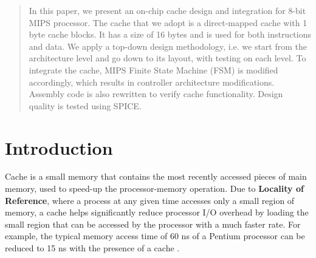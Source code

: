 \documentclass[conference]{IEEEtran}
\begin{document}




\maketitle


\begin{abstract}
In this paper, we present an on-chip cache design and integration for 8-bit MIPS
processor. The cache that we adopt is a direct-mapped cache with 1 byte cache
blocks. It has a size of 16 bytes and is used for both instructions and data. We
apply a top-down design methodology, i.e. we start from the architecture level
and go down to its layout, with testing on each level. To integrate the cache,
	MIPS Finite State Machine (FSM) is modified accordingly, which results in
	controller architecture modifications. Assembly code is also rewritten to verify
	cache functionality. Design quality is tested using SPICE.
\end{abstract}





%
\IEEEpeerreviewmaketitle



\section{Introduction}

Cache is a small memory that  contains the most recently accessed pieces of main memory, used to speed-up the processor-memory operation. Due to \textbf{Locality of Reference}, where a process at any given time accesses only a small region of memory, a cache helps significantly reduce processor I/O overhead by loading the small region that can be accessed by the processor with a much faster rate. For example, the typical memory access time of 60 ns of a Pentium processor can be reduced to 15 ns with the presence of a cache \cite{intel}.
\end{document}
